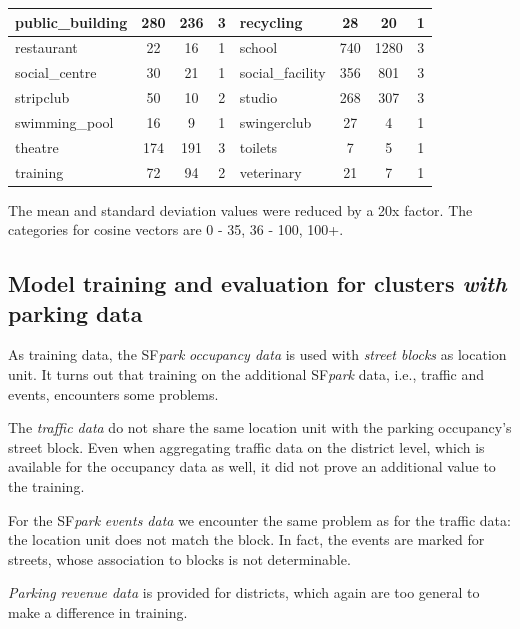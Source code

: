 \begin{table}[!ht]
{\begin{tabular}{ | l | c | c | c || l | c | c | c |}
			public\_building & 280 & 236 & 3 & recycling & 28 & 20 & 1 \\ \hline
			restaurant & 22 & 16 & 1 & school & 740 & 1280 & 3 \\ \hline
			social\_centre & 30 & 21 & 1 & social\_facility & 356 & 801 & 3 \\ \hline
			stripclub & 50 & 10 & 2 & studio & 268 & 307 & 3 \\ \hline
			swimming\_pool & 16 & 9 & 1 & swingerclub & 27 & 4 & 1 \\ \hline
			theatre & 174 & 191 & 3 & toilets & 7 & 5 & 1 \\ \hline
			training & 72 & 94 & 2 & veterinary & 21 & 7 & 1 \\ \hline
	\end{tabular}}
	\label{tab:amenity_area_values}
	\begin{tabnote}
		The mean and standard deviation values were reduced by a 20x factor. The categories for cosine vectors are 0 - 35, 36 - 100, 100+.
	\end{tabnote}
\end{table}

\subsection{Model training and evaluation for clusters \emph{with} parking data}
\label{experimental_setup:model_training}
As training data, the SF\textit{park} \textit{occupancy data} is used with \textit{street blocks} as location unit. 
It turns out that training on the additional SF\textit{park} data, i.e., traffic and events, encounters some problems. 

The \textit{traffic data} do not share the same location unit with the parking occupancy's street block. Even when aggregating traffic data on the district level, which is available for the occupancy data as well, it did not prove an additional value to the training. 

For the SF\textit{park} \textit{events data} we encounter the same problem as for the traffic data: the location unit does not match the block. In fact, the events are marked for streets, whose association to blocks is not determinable. 

\textit{Parking revenue data} is provided for districts, which again are too general to make a difference in training.

